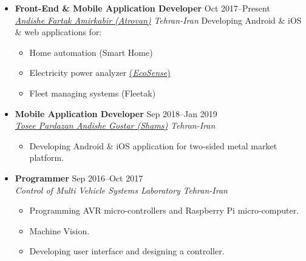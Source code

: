 \documentclass[10pt,a4paper,sans]{moderncv} %
\newcommand*{\authorimg}[1]{%
	\raisebox{-.3\baselineskip}{%
		\texttt{[image: \#1]}%
	}%
}
\begin{document}
\begin{itemize}
	
	\item \textbf{Front-End \& Mobile Application Developer} \hfill Oct 2017--Present \\
	\href{https://atrovan.com}{\authorimg{pictures/atrovan.png} \emph{Andishe Fartak Amirkabir (Atrovan)}} \hfill \emph{Tehran-Iran}
	\vspace{1mm}
	\linebreak
	Developing Android \& iOS \& web applications for:
	\begin{itemize}
		\item Home automation (Smart Home)
		\item Electricity power analyzer \href{https://atrovan.com/EcoSense}{(\emph{EcoSense})}
		\item Fleet managing systems (Fleetak)
	\end{itemize}
	
	\item \textbf{Mobile Application Developer} \hfill Sep 2018--Jan 2019 \\
	\href{http://shamstech.ir}{\authorimg{pictures/shams.png} \emph{Tosee Pardazan Andishe Gostar (Shams)}} \hfill \emph{Tehran-Iran}
	
	\begin{itemize}
		\item Developing Android \& iOS application for two-sided metal market platform.
	\end{itemize}
	
	\item \textbf{Programmer} \hfill Sep 2016--Oct 2017 \\
	\authorimg{pictures/aut.png} \emph{Control of Multi Vehicle Systems Laboratory} \hfill \emph{Tehran-Iran}
	
	\begin{itemize}
		\item Programming AVR micro-controllers and Raspberry Pi micro-computer. 
		\item Machine Vision. 
		\item Developing user interface and designing a controller.
	\end{itemize}
	
\end{itemize}

\end{document}
